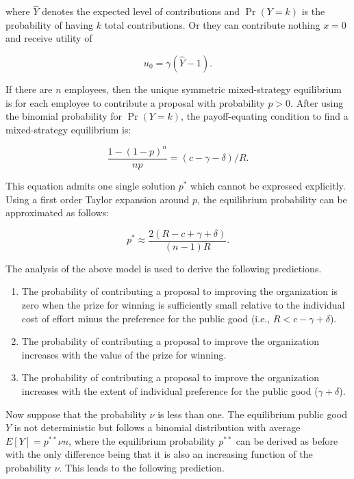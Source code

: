 \documentclass[11pt, titlepage]{article}
\begin{document}
where \(\hat Y\) denotes the expected level of contributions and
\(\Pr(Y=k)\) is the probability of having \(k\) total contributions. Or
they can contribute nothing \(x=0\) and receive utility of

\begin{equation}
  u_0 = \gamma (\hat Y - 1).
\end{equation}

If there are \(n\) employees, then the unique symmetric mixed-strategy
equilibrium is for each employee to contribute a proposal with
probability \(p>0\). After using the binomial probability for
\(\Pr(Y=k)\), the payoff-equating condition to find a mixed-strategy
equilibrium is:

\begin{equation} \label{eq: mixed-strategy}
  \frac{1- (1-p)^{n}}{n p} = (c- \gamma - \delta) / R.
\end{equation}

This equation admits one single solution \(p^*\) which cannot be
expressed explicitly. Using a first order Taylor expansion around \(p\),
the equilibrium probability can be approximated as follows:

\begin{equation} \label{eq: probability}
  p^*  \approx \frac{2 (R- c+\gamma +\delta )}{(n-1) R}. 
\end{equation}

The analysis of the above model is used to derive the following
predictions.

\begin{enumerate}
\def\labelenumi{\arabic{enumi})}
\item
  The probability of contributing a proposal to improving the
  organization is zero when the prize for winning is sufficiently small
  relative to the individual cost of effort minus the preference for the
  public good (i.e., \(R< c-\gamma +\delta\)).
\item
  The probability of contributing a proposal to improve the organization
  increases with the value of the prize for winning.
\item
  The probability of contributing a proposal to improve the organization
  increases with the extent of individual preference for the public good
  (\(\gamma+\delta\)).
\end{enumerate}

Now suppose that the probability \(\nu\) is less than one. The
equilibrium public good \(Y\) is not deterministic but follows a
binomial distribution with average \(E[Y] = p^{**}\nu n\), where the
equilibrium probability \(p^{**}\) can be derived as before with the
only difference being that it is also an increasing function of the
probability \(\nu\). This leads to the following prediction.
\end{document}
